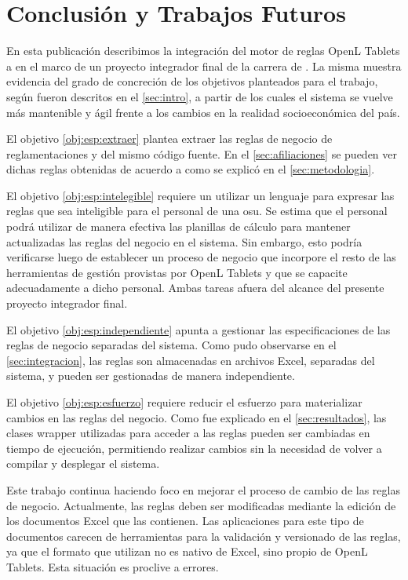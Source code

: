 \section{Conclusión y Trabajos Futuros}\label{sec:conclusiones}

En esta publicación describimos la integración del motor de reglas OpenL Tablets a
{\SIDOSPU} en el marco de un proyecto integrador final de la carrera de {\CARRERA}.
%
La misma muestra evidencia del grado de concreción de los objetivos planteados para el trabajo, según fueron descritos en el \cref{sec:intro}, a partir de los cuales el sistema se vuelve más mantenible y ágil frente a los cambios en la realidad socioeconómica del país.

El objetivo \ref{obj:esp:extraer} plantea extraer las reglas de negocio de reglamentaciones y del mismo código fuente. 
En el \cref{sec:afiliaciones} se pueden ver dichas reglas obtenidas de acuerdo a como se explicó en el \cref{sec:metodologia}. 

El objetivo \ref{obj:esp:intelegible} requiere un utilizar un lenguaje para expresar las reglas que sea inteligible para el personal de una \acrshort{osu}.
Se estima que el personal podrá utilizar de manera efectiva las planillas de cálculo para mantener actualizadas las reglas del negocio en el sistema.
Sin embargo, esto podría verificarse luego de establecer un proceso de negocio que incorpore el resto de las herramientas de gestión provistas por OpenL Tablets y que se capacite adecuadamente a dicho personal. 
Ambas tareas afuera del alcance del presente proyecto integrador final.

El objetivo \ref{obj:esp:independiente} apunta a gestionar las especificaciones de las reglas de negocio separadas del sistema. 
Como pudo observarse en el \cref{sec:integracion}, las reglas son almacenadas en archivos Excel, separadas del sistema, y pueden ser gestionadas de manera independiente.

El objetivo \ref{obj:esp:esfuerzo} requiere reducir el esfuerzo para materializar cambios en las reglas del negocio.
Como fue explicado en el \cref{sec:resultados}, las clases wrapper utilizadas para acceder a las reglas pueden ser cambiadas en tiempo de ejecución, permitiendo realizar cambios sin la necesidad de volver a compilar y desplegar el sistema.

Este trabajo continua haciendo foco en mejorar el proceso de cambio de las reglas de negocio.
%
Actualmente, las reglas deben ser modificadas mediante la edición de los documentos Excel que las contienen. 
Las aplicaciones para este tipo de documentos carecen de herramientas para la validación y versionado de las reglas, ya que el formato que utilizan no es nativo de Excel, sino propio de OpenL Tablets.
Esta situación es proclive a errores.

